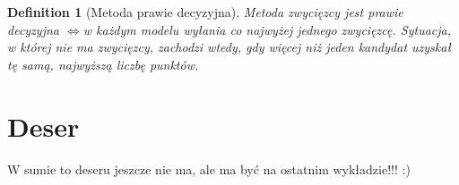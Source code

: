 \documentclass[12pt,a4paper]{article}
\theoremstyle{break}
\newtheorem{definition}{Definition}[section]
\newcommand{\witw}{$\Leftrightarrow$}
\begin{document}
\begin{definition}[Metoda prawie decyzyjna]
	Metoda zwycięzcy jest prawie decyzyjna \witw w każdym modelu wyłania co najwyżej jednego zwycięzcę. Sytuacja, w której nie ma zwycięzcy, zachodzi wtedy, gdy więcej niż jeden kandydat uzyskał tę samą, najwyższą liczbę punktów.
\end{definition}

	
	
	\newpage
	\section{Deser}
	W sumie to deseru jeszcze nie ma, ale ma być na ostatnim wykładzie!!! :)
	
	
\end{document}
